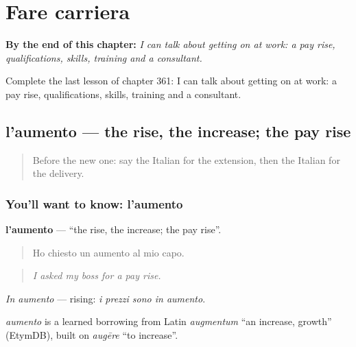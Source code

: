 
\chapter{Fare carriera}
\label{ch:it-fare-carriera}

\begin{chapteropening}
\textbf{By the end of this chapter:} \emph{I can talk about getting on at work: a pay rise, qualifications, skills, training and a consultant.}

Complete the last lesson of chapter 361: I can talk about getting on at work: a pay rise, qualifications, skills, training and a consultant.
\end{chapteropening}

\section[l'aumento]{l'aumento — the rise, the increase; the pay rise}

\label{lesson:IT-C361-aumento}



\begin{quote}
Before the new one: say the Italian for the extension, then the Italian for the delivery.
\end{quote}

\subsection*{You'll want to know: l'aumento}
\textbf{l'aumento} — \textquotedblleft{}the rise, the increase; the pay rise\textquotedblright{}.

\begin{quote}
Ho chiesto un aumento al mio capo.
\end{quote}

\begin{quote}
\emph{I asked my boss for a pay rise.}
\end{quote}

\emph{In aumento} — rising: \emph{i prezzi sono in aumento}.

\begin{cousinweb}
\emph{aumento} is a learned borrowing from Latin \emph{augmentum} \textquotedblleft{}an increase, growth\textquotedblright{} (EtymDB), built on \emph{augēre} \textquotedblleft{}to increase\textquotedblright{}.
\end{cousinweb}

